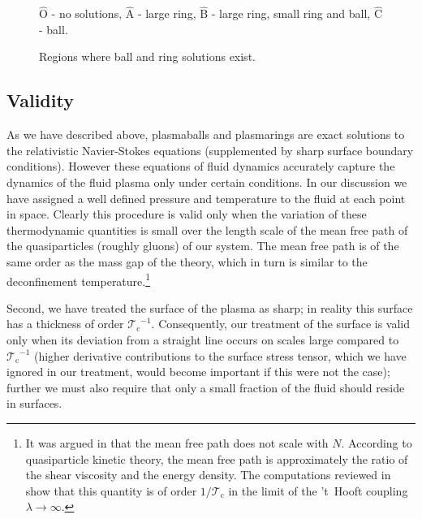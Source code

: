 \documentclass[12pt,a4paper]{article}
\newcommand{\ra}{\rightarrow}
\newcommand{\tA}{\hat{\mathrm{A}}}
\newcommand{\tB}{\hat{\mathrm{B}}}
\newcommand{\tC}{\hat{\mathrm{C}}}
\newcommand{\tOr}{\hat{\mathrm{O}}}
\newcommand{\tc}{\mathcal{T_\mathrm{c}}}
\begin{document}
\begin{figure}
%
 \begin{center}
  \small{$\tOr$ - no solutions, $\tA$ - large ring, $\tB$ - large ring, small ring
  and ball, $\tC$ - ball.}\\
   
   \hspace{2.5cm}
   
 \caption{Regions where ball and ring solutions exist.}
\label{exist_final:fig}
 \end{center}
\end{figure}




\subsection{Validity}\label{sec:validity}

As we have described above,  plasmaballs and plasmarings are exact
solutions to the relativistic Navier-Stokes equations (supplemented
by sharp surface boundary conditions). However these equations of
fluid dynamics accurately capture the dynamics of the fluid plasma
only under certain conditions. In our discussion we have assigned a
well defined pressure and temperature to the fluid at each point in
space. Clearly this procedure is valid only when the variation of
these thermodynamic quantities is small over the length scale of the
mean free path of the quasiparticles (roughly gluons) of our system.
The mean free path is of the same order as the mass gap of the
theory, which in turn is similar to the deconfinement
temperature.\footnote{It was argued in \cite{Aharony:2005bm} that
the mean free path does not scale with $N$. According to
quasiparticle kinetic theory, the mean free path is approximately
the ratio of the shear viscosity and the energy density. The
computations reviewed in \cite{Son:2007vk} show that this quantity
is of order $1/\tc$ in the limit of the 't~Hooft coupling
$\lambda\ra\infty$.}

Second, we have treated the surface of the plasma as sharp; in
reality this surface has a thickness of order $\tc^{-1}$.
Consequently, our treatment of the surface is valid only when its
deviation from a straight line occurs on scales large compared to
$\tc^{-1}$ (higher derivative contributions to the surface stress
tensor, which we have ignored in our treatment, would become
important if this were not the case); further we must also require
that only a small fraction of the fluid should reside in surfaces.
\end{document}
